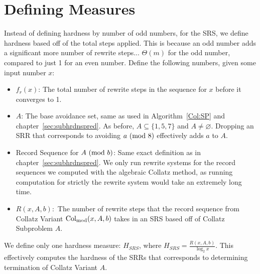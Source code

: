 \section{Defining Measures} \label{subsec:rewritemeasuredefs}
Instead of defining hardness by number of odd numbers, for the SRS, we define hardness based off of the total steps applied. This is because an odd number adds a significant more number of rewrite steps... $\Theta(m)$ for the odd number, compared to just 1 for an even number. Define the following numbers, given some input number $x$:
\begin{itemize}
    \item $f_r(x)$: The total number of rewrite steps in the sequence for $x$ before it converges to 1.
    \item $A$: The base avoidance set, same as used in Algorithm~\ref{Col:SP} and chapter~\ref{sec:subhrdnspred}. As before, $A \subseteq \{1, 5, 7\}$ and $A \ne \varnothing$. Dropping an SRR that corresponds to avoiding $a \ (\mathrm{mod}\ 8)$  effectively adds $a$ to $A$.
    \item Record Sequence for $A \ (\mathrm{mod}\ b)$: Same exact definition as in chapter~\ref{sec:subhrdnspred}. We only run rewrite systems for the record sequences we computed with the algebraic Collatz method, as running computation for strictly the rewrite system would take an extremely long time.
    \item $R(x, A, b):$ The number of rewrite steps that the record sequence from Collatz Variant $\mathrm{Col}_{\text{mod}}(x,A,b)$ takes in an SRS based off of Collatz Subproblem $A$. 
\end{itemize}
We define only one hardness measure: $H_{SRS}$, where $H_{SRS} = \frac{R(x, A, b)}{\log_2{x}}$. This effectively computes the hardness of the SRRs that corresponds to determining termination of Collatz Variant $A$.



